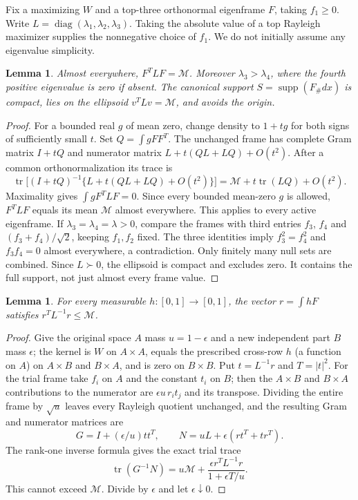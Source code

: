 \documentclass[11pt]{article}
\newtheorem{lemma}[theorem]{Lemma}
\theoremstyle{remark}\newtheorem{remark}[theorem]{Remark}
\DeclareMathOperator{\tr}{tr}
\DeclareMathOperator{\diag}{diag}
\DeclareMathOperator{\supp}{supp}
\numberwithin{equation}{section}
\begin{document}
Fix a maximizing $W$ and a top-three orthonormal eigenframe $F$, taking
$f_1\ge0$. Write $L=\diag(\lambda_1,\lambda_2,\lambda_3)$.
Taking the absolute value of a top Rayleigh maximizer supplies the
nonnegative choice of $f_1$. We do not initially assume any eigenvalue simplicity.
\begin{lemma}\label{ellipse-structure}
Almost everywhere, $F^TLF=\mathcal M$. Moreover
$\lambda_3>\lambda_4$, where the fourth positive eigenvalue is zero if
absent. The canonical support $S=\supp(F_\#dx)$ is compact, lies on the
ellipsoid $v^TLv=\mathcal M$, and avoids the origin.
\end{lemma}
\begin{proof}
For a bounded real $g$ of mean zero, change density to $1+tg$ for both
signs of sufficiently small $t$. Set $Q=\int gFF^T$. The unchanged frame
has complete Gram matrix $I+tQ$ and numerator matrix
$L+t(QL+LQ)+O(t^2)$. After a common orthonormalization its trace is
\[
 \tr\bigl[(I+tQ)^{-1}\{L+t(QL+LQ)+O(t^2)\}\bigr]
   =\mathcal M+t\tr(LQ)+O(t^2).
\]
Maximality gives $\int gF^TLF=0$. Since every bounded mean-zero $g$ is
allowed, $F^TLF$ equals its mean $\mathcal M$ almost everywhere.
This applies to every active eigenframe. If
$\lambda_3=\lambda_4=\lambda>0$, compare the frames with third entries
$f_3$, $f_4$ and $(f_3+f_4)/\sqrt2$, keeping $f_1,f_2$ fixed.
The three identities imply $f_3^2=f_4^2$ and $f_3f_4=0$ almost everywhere,
a contradiction. Only finitely many null sets are combined.
Since $L\succ0$, the ellipsoid is compact and excludes zero. It contains
the full support, not just almost every frame value.
\end{proof}

\begin{lemma}\label{row-insertion}
For every measurable $h:[0,1]\to[0,1]$, the vector $r=\int hF$ satisfies
$r^TL^{-1}r\le\mathcal M$.
\end{lemma}
\begin{proof}
Give the original space $A$ mass $u=1-\epsilon$ and a new independent part
$B$ mass $\epsilon$; the kernel is $W$ on $A\times A$, equals the prescribed
cross-row $h$ (a function on $A$) on $A\times B$ and $B\times A$, and is zero
on $B\times B$. Put $t=L^{-1}r$ and $T=|t|^2$. For the trial frame take $f_i$
on $A$ and the constant $t_i$ on $B$; then the $A\times B$ and $B\times A$
contributions to the numerator are $\epsilon u\,r_it_j$ and its transpose.
Dividing the entire frame by $\sqrt u$ leaves every Rayleigh quotient
unchanged, and the resulting Gram and numerator matrices are
\[
 G=I+(\epsilon/u)tt^T,\qquad
 N=uL+\epsilon(rt^T+tr^T).
\]
The rank-one inverse formula gives the exact trial trace
\[
 \tr(G^{-1}N)=u\mathcal M+
       \frac{\epsilon r^TL^{-1}r}{1+\epsilon T/u}.
\]
This cannot exceed $\mathcal M$. Divide by $\epsilon$ and let
$\epsilon\downarrow0$.
\end{proof}
\end{document}
